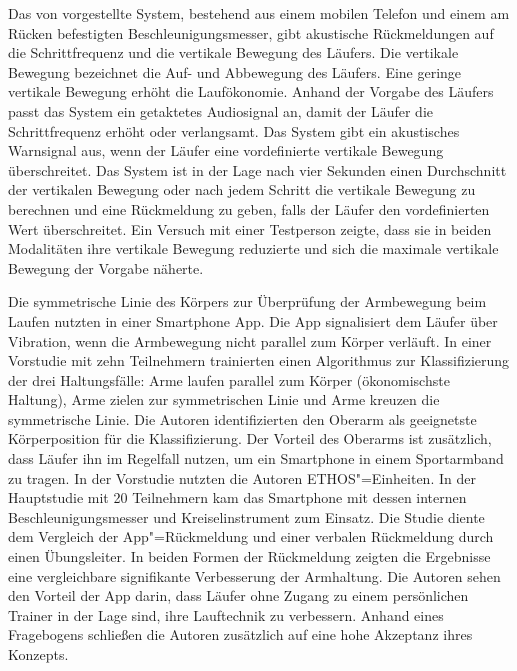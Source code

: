 Das von \citet{Eriksson2010} vorgestellte System, bestehend aus einem mobilen Telefon und einem am Rücken befestigten Beschleunigungsmesser, gibt akustische Rückmeldungen auf die Schrittfrequenz und die vertikale Bewegung des Läufers. Die vertikale Bewegung bezeichnet die Auf- und Abbewegung des Läufers. Eine geringe vertikale Bewegung erhöht die Laufökonomie. Anhand der Vorgabe des Läufers passt das System ein getaktetes Audiosignal an, damit der Läufer die Schrittfrequenz erhöht oder verlangsamt. Das System gibt ein akustisches Warnsignal aus, wenn der Läufer eine vordefinierte vertikale Bewegung überschreitet. Das System ist in der Lage nach vier Sekunden einen Durchschnitt der vertikalen Bewegung oder nach jedem Schritt die vertikale Bewegung zu berechnen und eine Rückmeldung zu geben, falls der Läufer den vordefinierten Wert überschreitet. Ein Versuch mit einer Testperson zeigte, dass sie in beiden Modalitäten ihre vertikale Bewegung reduzierte und sich die maximale vertikale Bewegung der Vorgabe näherte.

Die symmetrische Linie des Körpers zur Überprüfung der Armbewegung beim Laufen nutzten \citet{Strohrmann2013, Strohrmann2014} in einer Smartphone App. Die App signalisiert dem Läufer über Vibration, wenn die Armbewegung nicht parallel zum Körper verläuft. In einer Vorstudie mit zehn Teilnehmern trainierten \citet{Strohrmann2013} einen Algorithmus zur Klassifizierung der drei Haltungsfälle: Arme laufen parallel zum Körper (ökonomischste Haltung), Arme zielen zur symmetrischen Linie und Arme kreuzen die symmetrische Linie. Die Autoren identifizierten den Oberarm als geeignetste Körperposition für die Klassifizierung. Der Vorteil des Oberarms ist zusätzlich, dass Läufer ihn im Regelfall nutzen, um ein Smartphone in einem Sportarmband zu tragen. In der Vorstudie nutzten die Autoren ETHOS"=Einheiten. In der Hauptstudie mit 20 Teilnehmern kam das Smartphone mit dessen internen Beschleunigungsmesser und Kreiselinstrument zum Einsatz. Die Studie diente dem Vergleich der App"=Rückmeldung und einer verbalen Rückmeldung durch einen Übungsleiter. In beiden Formen der Rückmeldung zeigten die Ergebnisse eine vergleichbare signifikante Verbesserung der Armhaltung. Die Autoren sehen den Vorteil der App darin, dass Läufer ohne Zugang zu einem persönlichen Trainer in der Lage sind, ihre Lauftechnik zu verbessern. Anhand eines Fragebogens schließen die Autoren zusätzlich auf eine hohe Akzeptanz ihres Konzepts.

